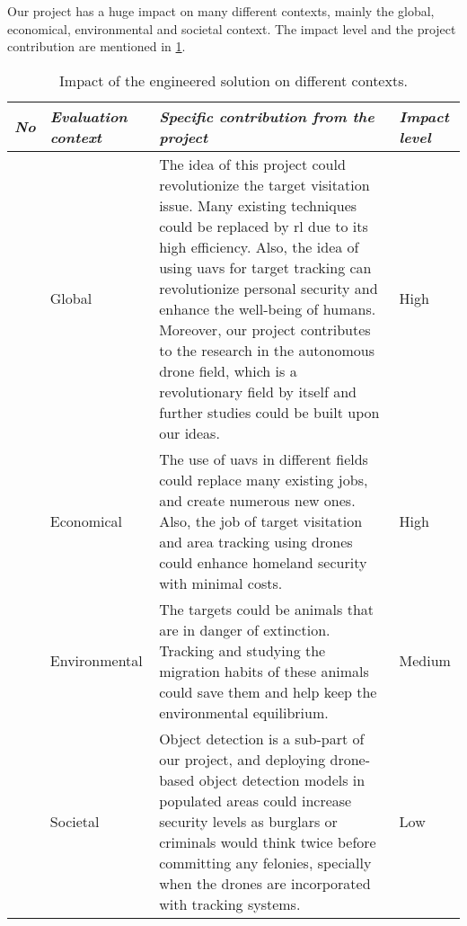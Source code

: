 \documentclass[../main.tex]{subfiles}
\begin{document}
\setcounter{impactcounter}{1}
\newcommand\showimpactcounter{%
    \theimpactcounter\stepcounter{impactcounter}%
}

Our project has a huge impact on many different contexts, mainly the global, 
economical, environmental and societal context. The impact level and the 
project contribution are mentioned in \cref{tab:impact}.

\begin{table}[H]
    \centering
    \caption{Impact of the engineered solution on 
    different contexts.}
    \label{tab:impact}
    \begin{tabularx}{\textwidth}{ c l X l }
        \toprule
        \textit{No} 
            & \textit{Evaluation context} 
        & \textit{Specific contribution from the project} 
            & \textit{Impact level} \\

        \midrule
        
        \showimpactcounter
            & Global 
        & The idea of this project could revolutionize the target visitation 
        issue. Many existing techniques could be replaced by \gls{rl} due to 
        its high efficiency. Also, the idea of using \glspl{uav} for target 
        tracking can revolutionize personal security and enhance the 
        well-being of humans. Moreover, our project contributes to the 
        research in the autonomous drone field, which is a revolutionary field 
        by itself and further studies could be built upon our ideas.
            & High \\
        
        \showimpactcounter
            & Economical 
        & The use of \glspl{uav} in different fields could replace many 
        existing jobs, and create numerous new ones. Also, the job of target 
        visitation and area tracking using drones could enhance homeland 
        security with minimal costs.
            & High\\

        \showimpactcounter
            & Environmental 
        & The targets could be animals that are in danger of extinction. 
        Tracking and studying the migration habits of these animals could save 
        them and help keep the environmental equilibrium. 
            & Medium\\

        \showimpactcounter
            & Societal 
        & Object detection is a sub-part of our project, and deploying 
        drone-based object detection models in populated areas could increase 
        security levels as burglars or criminals would think twice before 
        committing any felonies, specially when the drones are incorporated 
        with tracking systems. 
            & Low\\ 

        \bottomrule		
    \end{tabularx}
\end{table}

\end{document}
